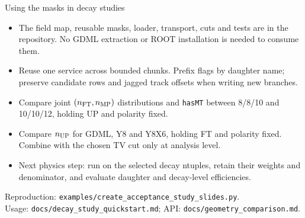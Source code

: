 \documentclass[aspectratio=169,10pt]{beamer}
\begin{document}
\begin{frame}{Using the masks in decay studies}
\begin{itemize}
\item The field map, reusable masks, loader, transport, cuts and tests are in
the repository. No GDML extraction or ROOT installation is needed to consume them.
\item Reuse one service across bounded chunks. Prefix flags by daughter name;
preserve candidate rows and jagged track offsets when writing new branches.
\item Compare joint $(n_{\rm FT},n_{\rm MP})$ distributions and \texttt{hasMT}
between 8/8/10 and 10/10/12, holding UP and polarity fixed.
\item Compare $n_{\rm UP}$ for GDML, Y8 and Y8X6, holding FT and polarity fixed.
Combine with the chosen TV cut only at analysis level.
\item Next physics step: run on the selected decay ntuples, retain their
weights and denominator, and evaluate daughter and decay-level efficiencies.
\end{itemize}
\small Reproduction: \texttt{examples/create\_acceptance\_study\_slides.py}.\\
Usage: \texttt{docs/decay\_study\_quickstart.md}; API: \texttt{docs/geometry\_comparison.md}.
\end{frame}
\end{document}
